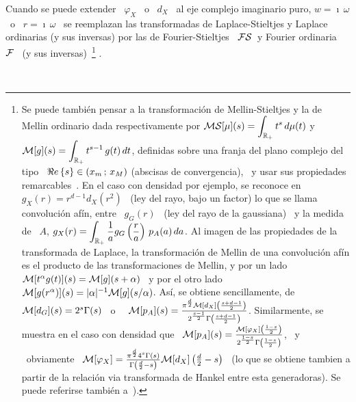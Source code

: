 Cuando se puede extender \ $\varphi_X$ \  o \ $d_X$ \ al eje complejo imaginario
puro, $w  = \imath \, \omega$ \  o \ $r =  \imath \, \omega$ \  se reemplazan las
transformadas de Laplace-Stieltjes y Laplace ordinarias (y sus inversas) por las
de  Fourier-Stieltjes   \  $\mathcal{FS}$\   y  Fourier  ordinaria   \  $\mathcal{F}$  \   (y  sus
inversas)~\footnote{Se   puede  tambi\'en  pensar   a  la   transformaci\'on  de
  Mellin-Stieltjes   y  la   de  Mellin   ordinario  dada   respectivamente  por
  $\displaystyle  \mathcal{MS}[\mu](s) =  \int_{\mathbb{R}_+} t^s  \, d\mu(t)$  \quad  y \quad
  $\displaystyle  \mathcal{M}[g](s) = \int_{\mathbb{R}_+}  t^{s-1} \,  g(t) \,  dt$, definidas
  sobre una  franja del  plano complejo del  tipo \  $\Re e \left\{ s \right\} \in (x_m  \, ; \, x_M)$
  (abscisas de convergencia), \  y usar sus propiedades remarcables~\cite{Zol57,
    Pou99, Pou10,  Wid46, ParKam01}.   En el caso  con densidad por  ejemplo, se
  reconoce en \  $g_X(r) = r^{d-1} d_X\left( r^2 \right)$ \  (ley del rayo, bajo
  un factor) lo  que se llama convoluci\'on af\'in, entre \  $g_G(r)$ \ (ley del
  rayo  de  la gaussiana)  \  y  la medida  de  \  $A$,  $\displaystyle g_X(r)  =
  \int_{\mathbb{R}_+} \frac{1}{a} g_G\left( \frac{r}{a} \right) \, p_A(a) \, da$.  Al
  imagen de las  propiedades de la transformada de  Laplace, la transformaci\'on
  de Mellin de  una convoluci\'on af\'in es el  producto de las transformaciones
  de Mellin, y por un lado \ $\mathcal{M}[t^\alpha g(t)](s) = \mathcal{M}[g](s+\alpha)$ \ y por el
  otro lado  \ $\mathcal{M}[g(r^\alpha)](s) = |\alpha|^{-1}  \mathcal{M}[g](s/\alpha)$.  As\'i, se
  obtiene  sencillamente,  de  \  $\mathcal{M}[d_G](s)  =  2^s  \Gamma(s)$~\cite[Cap.~12,
  Tabla~12.1]{Pou10}   o~\cite[Cap.~18,  Tabla~18.1]{Pou99}   \   $\mathcal{M}[p_A](s)  =
  \frac{\pi^{\frac{d}{2}}              \mathcal{M}[d_X]\left(             \frac{s+d-1}{2}
    \right)}{2^{\frac{s-1}{2}} \Gamma\left( \frac{s+d-1}{2} \right)}$.
  Similarmente,  se  muestra  en  el  caso  con densidad  que  \  $\mathcal{M}[p_A](s)  =
  \frac{\mathcal{M}[\varphi_X]\left(       \frac{1-s}{2}       \right)}{2^{\frac{1-s}{2}}
    \Gamma\left( \frac{1-s}{2} \right)}$,
  \   y   \   obviamente   \  $\mathcal{M}[\varphi_X]   =   \frac{\pi^{\frac{d}{2}}   4^s
    \Gamma(s)}{\Gamma\left( \frac{d}{2} - s \right)} \mathcal{M}[d_X]\left( \frac{d}{2} -
    s  \right)$ \  (lo que  se obtiene  tambien a  partir de  la  relaci\'on via
  transformada de  Hankel entre esta generadoras). Se  puede referirse tambi\'en
  a~\cite[\S~3.2.1]{Zoz12}).  }
%
\cite{Zol57, Pou99, Pou10, Wid46, ParKam01}.

\

